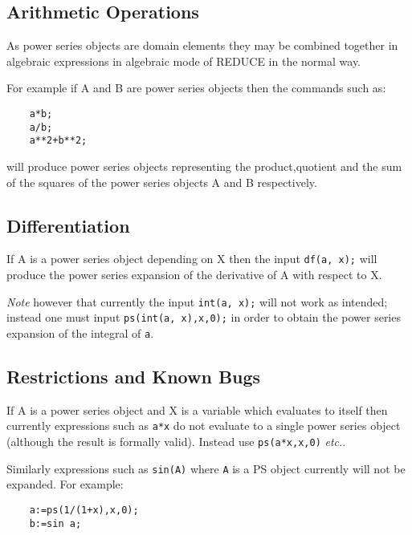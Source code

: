 \subsection{Arithmetic Operations}

As power series objects are domain elements they may be combined
together in algebraic expressions in algebraic mode of REDUCE in the
normal way.
 
For example if A and B are power series objects then the commands
such as:

 
 
\begin{verbatim}
    a*b;
    a/b;
    a**2+b**2;
\end{verbatim}

will produce power series objects representing the product,quotient
and the sum of the squares of the power series objects A and B
respectively.
 
\subsection{Differentiation}

If A is a power series object depending on X then the input
{\tt df(a, x);} will produce the power series expansion of the
derivative of A with respect to X.

{\em Note} however that currently the input  {\tt int(a, x);} will
not work as intended; instead one must input
{\tt ps(int(a, x),x,0);}
in order to obtain the power series expansion of the integral of
{\tt a}.

\subsection{Restrictions and Known Bugs}

If A is a power series object and X is a variable
which evaluates to itself then currently expressions such as {\tt a*x}
do not evaluate to a single power series object (although the 
result is formally valid).  Instead use {\tt ps(a*x,x,0)} {\em etc.}.

Similarly expressions such as {\tt sin(A)} where {\tt A} is a PS object
currently will not be expanded. For example:

\begin{verbatim}
    a:=ps(1/(1+x),x,0);
    b:=sin a;
\end{verbatim}

